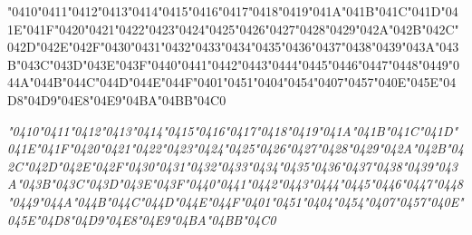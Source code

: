 {\LibertinusSerifPatch
	\char"0410\gs \char"0411\gs \char"0412\gs \char"0413\gs \char"0414\gs \char"0415\gs \char"0416\gs \char"0417\gs \char"0418\gs \char"0419\gs \char"041A\gs \char"041B\gs \char"041C\gs \char"041D\gs \char"041E\gs \char"041F\gs \char"0420\gs \char"0421\gs \char"0422\gs \char"0423\gs \char"0424\gs \char"0425\gs \char"0426\gs \char"0427\gs \char"0428\gs \char"0429\gs \char"042A\gs \char"042B\gs \char"042C\gs \char"042D\gs \char"042E\gs \char"042F\gs \char"0430\gs \char"0431\gs \char"0432\gs \char"0433\gs \char"0434\gs \char"0435\gs \char"0436\gs \char"0437\gs \char"0438\gs \char"0439\gs \char"043A\gs \char"043B\gs \char"043C\gs \char"043D\gs \char"043E\gs \char"043F\gs \char"0440\gs \char"0441\gs \char"0442\gs \char"0443\gs \char"0444\gs \char"0445\gs \char"0446\gs \char"0447\gs \char"0448\gs \char"0449\gs \char"044A\gs \char"044B\gs \char"044C\gs \char"044D\gs \char"044E\gs \char"044F\gs \char"0401\gs \char"0451\gs \char"0404\gs \char"0454\gs \char"0407\gs \char"0457\gs \char"040E\gs \char"045E\gs \char"04D8\gs \char"04D9\gs \char"04E8\gs \char"04E9\gs \char"04BA\gs \char"04BB\gs \char"04C0\gs
}

{\LibertinusSerifPatch\itshape 
	\char"0410\gs \char"0411\gs \char"0412\gs \char"0413\gs \char"0414\gs \char"0415\gs \char"0416\gs \char"0417\gs \char"0418\gs \char"0419\gs \char"041A\gs \char"041B\gs \char"041C\gs \char"041D\gs \char"041E\gs \char"041F\gs \char"0420\gs \char"0421\gs \char"0422\gs \char"0423\gs \char"0424\gs \char"0425\gs \char"0426\gs \char"0427\gs \char"0428\gs \char"0429\gs \char"042A\gs \char"042B\gs \char"042C\gs \char"042D\gs \char"042E\gs \char"042F\gs \char"0430\gs \char"0431\gs \char"0432\gs \char"0433\gs \char"0434\gs \char"0435\gs \char"0436\gs \char"0437\gs \char"0438\gs \char"0439\gs \char"043A\gs \char"043B\gs \char"043C\gs \char"043D\gs \char"043E\gs \char"043F\gs \char"0440\gs \char"0441\gs \char"0442\gs \char"0443\gs \char"0444\gs \char"0445\gs \char"0446\gs \char"0447\gs \char"0448\gs \char"0449\gs \char"044A\gs \char"044B\gs \char"044C\gs \char"044D\gs \char"044E\gs \char"044F\gs \char"0401\gs \char"0451\gs \char"0404\gs \char"0454\gs \char"0407\gs \char"0457\gs \char"040E\gs \char"045E\gs \char"04D8\gs \char"04D9\gs \char"04E8\gs \char"04E9\gs \char"04BA\gs \char"04BB\gs \char"04C0\gs
}

